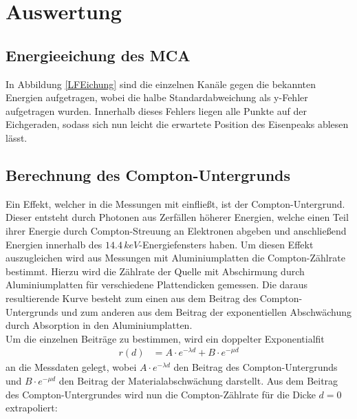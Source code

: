 \section{Auswertung}

\subsection{Energieeichung des MCA}





In Abbildung \ref{LFEichung} sind die einzelnen Kanäle gegen die bekannten Energien aufgetragen, wobei die halbe Standardabweichung als y-Fehler aufgetragen wurden. Innerhalb dieses Fehlers liegen alle Punkte auf der Eichgeraden, sodass sich nun leicht die erwartete Position des Eisenpeaks ablesen lässt.



\subsection{Berechnung des Compton-Untergrunds}

Ein Effekt, welcher in die Messungen mit einfließt, ist der Compton-Untergrund. Dieser entsteht durch Photonen aus Zerfällen höherer Energien, welche einen Teil ihrer Energie durch Compton-Streuung an Elektronen abgeben und anschließend Energien innerhalb des $14.4\,\si{keV}$-Energiefensters haben. Um diesen Effekt auszugleichen wird aus Messungen mit Aluminiumplatten die Compton-Zählrate bestimmt. Hierzu wird die Zählrate der Quelle mit Abschirmung durch Aluminiumplatten für verschiedene Plattendicken gemessen. Die daraus resultierende Kurve besteht zum einen aus dem Beitrag des Compton-Untergrunds und zum anderen aus dem Beitrag der exponentiellen Abschwächung durch Absorption in den Aluminiumplatten.\\

Um die einzelnen Beiträge zu bestimmen, wird ein doppelter Exponentialfit
\begin{align}
	r(d)&=A\cdot e^{-\lambda d}+B\cdot e^{-\mu d}
\end{align}
an die Messdaten gelegt, wobei $A\cdot e^{-\lambda d}$ den Beitrag des Compton-Untergrunds und $B\cdot e^{-\mu d}$ den Beitrag der Materialabschwächung darstellt. Aus dem Beitrag des Compton-Untergrundes wird nun die Compton-Zählrate für die Dicke $d=0$ extrapoliert:

